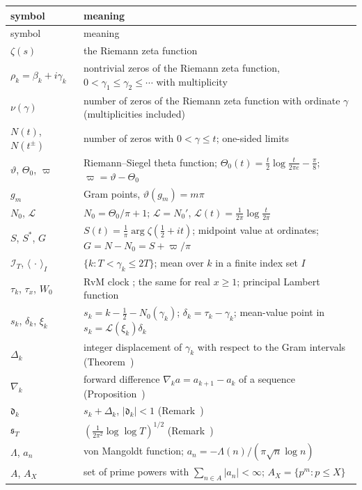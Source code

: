 \documentclass[preprint,12pt]{elsarticle}
\makeatletter
\let\CG@origref\ref
\let\CG@origeqref\eqref
\newcommand{\CG@gettip}[1]{\@ifundefined{CGTip@#1}{Reference: #1}{\csname CGTip@#1\endcsname}}
\DeclareRobustCommand{\CGref}[1]{\pdftooltip{\CG@origref{#1}}{\CG@gettip{#1}}}
\DeclareRobustCommand{\CGeqref}[1]{\pdftooltip{\CG@origeqref{#1}}{\CG@gettip{#1}}}
\numberwithin{equation}{section}
\theoremstyle{plain}
\theoremstyle{definition}
\theoremstyle{remark}
\newcommand{\NO}{N_0}
\newcommand{\lL}{\mathcal L}
\newcommand{\IT}{\mathcal I_T}
\makeatother
\begin{document}
\begin{center}
\small
\begin{longtable}{p{}p{}}
\toprule
symbol & meaning\\
\midrule
\endfirsthead
\toprule
symbol & meaning\\
\midrule
\endhead
\bottomrule
\endfoot
$\zeta(s)$ & the Riemann zeta function\\
$\rho_k=\beta_k+i\gamma_k$ & nontrivial zeros of the Riemann zeta function, $0<\gamma_1\le\gamma_2\le\cdots$ with multiplicity\\
$\nu(\gamma)$ & number of zeros of the Riemann zeta function with ordinate $\gamma$ (multiplicities included)\\
$N(t)$, $N(t^\pm)$ & number of zeros with $0<\gamma\le t$; one-sided limits\\
$\vartheta$, $\Theta_0$, $\varpi$ & Riemann--Siegel theta function; $\Theta_0(t)=\frac t2\log\frac t{2\pi e}-\frac\pi8$; $\varpi=\vartheta-\Theta_0$\\
$g_m$ & Gram points, $\vartheta(g_m)=m\pi$\\
$\NO$, $\lL$ & $\NO=\Theta_0/\pi+1$; $\lL=\NO'$, $\lL(t)=\frac1{2\pi}\log\frac t{2\pi}$\\
$S$, $S^*$, $G$ & $S(t)=\frac1\pi\arg\zeta(\frac12+it)$; midpoint value at ordinates; $G=N-\NO=S+\varpi/\pi$\\
$\IT$, $\langle\,\cdot\,\rangle_I$ & $\{k:T<\gamma_k\le2T\}$; mean over $k$ in a finite index set $I$\\
$\tau_k$, $\tau_x$, $W_0$ & RvM clock \CGeqref{eq:clock}; the same for real $x\ge1$; principal Lambert function\\
$s_k$, $\delta_k$, $\xi_k$ & $s_k=k-\frac12-\NO(\gamma_k)$; $\delta_k=\tau_k-\gamma_k$; mean-value point in $s_k=\lL(\xi_k)\delta_k$\\
$\Delta_k$ & integer displacement of $\gamma_k$ with respect to the Gram intervals (Theorem~\CGref{thm:known_korolev})\\
$\nabla_k$ & forward difference $\nabla_ka=a_{k+1}-a_k$ of a sequence (Proposition~\CGref{prop:deformation})\\
$\mathfrak d_k$ & $s_k+\Delta_k$, $|\mathfrak d_k|<1$ (Remark~\CGref{rem:korolev})\\
$\mathfrak s_T$ & $(\frac1{2\pi^2}\log\log T)^{1/2}$ (Remark~\CGref{rem:korolev})\\
$\Lambda$, $a_n$ & von Mangoldt function; $a_n=-\Lambda(n)/(\pi\sqrt n\log n)$\\
$A$, $A_X$ & set of prime powers with $\sum_{n\in A}|a_n|<\infty$; $A_X=\{p^m:p\le X\}$\\

\end{longtable}
\end{center}
\end{document}
